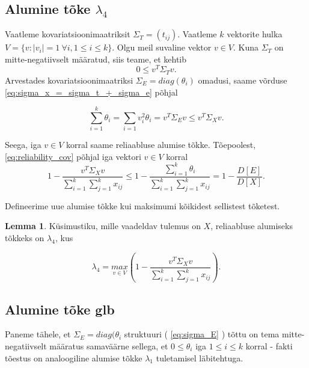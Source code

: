 \documentclass[a4paper,12pt,oneside]{article}
\newcounter{lemma}[section]
\numberwithin{equation}{section}
\theoremstyle{definition}
\newtheorem{lambda_4}[lemma]{Lemma}
\begin{document}
 

 
\subsection{Alumine tõke $\lambda_4$}

Vaatleme kovariatsioonimaatriksit $\Sigma_T=\left(t_{ij} \right)$. Vaatleme $k$ vektorite hulka $V = \lbrace v : \lvert {v_i} \rvert = 1 ~ \forall i, 1 \leq i \leq k \rbrace$.  Olgu meil suvaline vektor $v \in V$. Kuna $\Sigma_T$ on mitte-negatiivselt määratud, siis teame, et kehtib
\begin{equation*}
0 \leq v^{T} \Sigma_T v \text{.}
\end{equation*}
Arvestades kovariatsioonimaatriksi $\Sigma_E=diag(\theta_i)$ omadusi, saame võrduse \eqref{eq:sigma_x_=_sigma_t_+_sigma_e} põhjal 

\begin{equation*}
\sum \limits_{i=1}^k \theta_i = \sum \limits_{i=1} v_{i}^{2} \theta_i = v^{T} \Sigma_E v \leq v^{T} \Sigma_X v \text{.}
\end{equation*}

Seega, iga $v \in V$ korral saame reliaabluse alumise tõkke. Tõepoolest, \eqref{eq:reliability_cov} põhjal iga vektori $v \in V$ korral 
\begin{equation*}
1 - \frac{v^T \Sigma_X v}{\sum \limits_{i=1}^k \sum \limits_{j=1}^k x_{ij}} \leq 1 - \frac{\sum \limits_{i=1}^k \theta_i}{\sum \limits_{i=1}^k \sum \limits_{j=1}^k x_{ij}} = 1 - \frac{D \left[ E \right]}{ D \left[X \right]  } \text{.}
\end{equation*} 

Defineerime  uue alumise tõkke kui maksimumi kõikidest sellistest tõketest.

\begin{lambda_4}
Küsimustiku, mille vaadeldav tulemus on $X$, reliaabluse alumiseks tõkkeks on $\lambda_4$, kus 

\begin{equation*}
\lambda_4  = \underset{v \in V}{max} \left( 1 - \frac{v^{T} \Sigma_X v}{\sum \limits_{i=1}^k \sum \limits_{j=1}^k x_{ij}} \right)\text{.}
\end{equation*}
\end{lambda_4}


\subsection{Alumine tõke glb}


Paneme tähele, et $\Sigma_E=diag(\theta_i$ struktuuri  ( \ref{eq:sigma_E} ) tõttu on tema mitte-negatiivselt määratus samaväärne sellega, et $0 \leq \theta_i$ iga $1 \leq i \leq k$ korral - fakti tõestus on analoogiline alumise tõkke $\lambda_1$ tuletamisel läbitehtuga.
\end{document}
